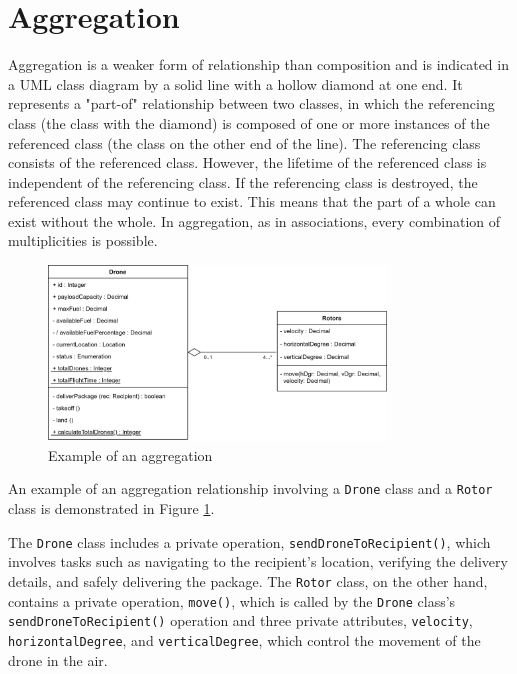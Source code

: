 \documentclass[
	12pt,
    a4paper,
    egregdoesnotlikesansseriftitles, %
    toc=chapterentrywithdots,
    oneside, openany,
    titlepage,
    parskip=half,
    headings=normal,  %
    listof=totoc,
    bibliography=totocnumbered,
    index=totoc,
    captions=tableheading,  %
    listof=flat,
    numbers=noenddot, %
    final]
    {scrbook}
\begin{document}
\section{Aggregation}
Aggregation is a weaker form of relationship than composition and is indicated in a UML class diagram by a solid line with a hollow diamond at one end. 
It represents a "part-of" relationship between two classes, in which the referencing class (the class with the diamond) is composed of one or more instances of the referenced class (the class on the other end of the line).
The referencing class consists of the referenced class.
However, the lifetime of the referenced class is independent of the referencing class.
If the referencing class is destroyed, the referenced class may continue to exist.
This means that the part of a whole can exist without the whole.
In aggregation, as in associations, every combination of multiplicities is possible. \cite[p. 153]{uml}


\begin{figure}[h]
	\centering
	\includegraphics[width=0.8\textwidth]{figures/aggr_comp/aggr.jpg}
	\caption[Example aggregation]{Example of an aggregation}
	\label{fig:aggregation_example} 
\end{figure}


An example of an aggregation relationship involving a \texttt{Drone} class and a \texttt{Rotor} class is demonstrated in Figure \ref{fig:aggregation_example}. 

The \texttt{Drone} class includes a private operation, \texttt{sendDroneToRecipient()}, which involves tasks such as navigating to the recipient's location, verifying the delivery details, and safely delivering the package.
The \texttt{Rotor} class, on the other hand, contains a private operation, \texttt{move()}, which is called by the \texttt{Drone} class's \texttt{sendDroneToRecipient()} operation and three private attributes, \texttt{velocity}, \texttt{horizontalDegree}, and \texttt{verticalDegree}, which control the movement of the drone in the air. 
\end{document}
